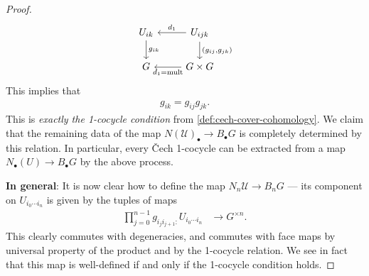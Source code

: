\documentclass[11pt,openany]{book}
\begin{document}
\begin{proof}
\[ \begin{tikzcd}
    U_{ik}\dar["g_{ik}"] & U_{ijk}\lar["d_1" above]\dar["{(g_{ij},g_{jk})}" right]\\
    G & G \times G\lar["d_1 = \text{mult}" below]
\end{tikzcd} \]
This implies that
\begin{align*}
    g_{ik} = g_{ij}g_{jk}.
\end{align*}
This is \textit{exactly the 1-cocycle condition} from \autoref{def:cech-cover-cohomology}. We claim that the remaining data of the map $N(\mathcal{U})_\bullet \to B_\bullet G$ is completely determined by this relation. In particular, every \v{C}ech 1-cocycle can be extracted from a map $N_\bullet(U) \to B_\bullet G$ by the above process.   

\textbf{In general}: It is now clear how to define the map $N_n \mathcal{U} \to B_n G$ --- its component on $U_{i_0 \cdots i_{n}}$ is given by the tuples of maps
\begin{align*}
    \prod_{j=0}^{n-1} g_{i_j i_{j+1} \colon }U_{i_0 \cdots i_{n}} &\to G^{\times n}.
\end{align*}
This clearly commutes with degeneracies, and commutes with face maps by universal property of the product and by the 1-cocycle relation. We see in fact that this map is well-defined if and only if the 1-cocycle condition holds.
\end{proof}
\end{document}
